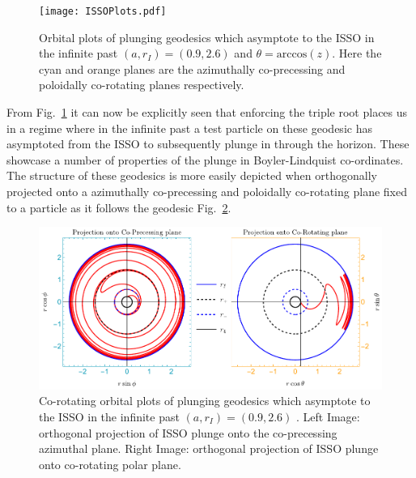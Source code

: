 \documentclass[12pt, amsmath]{revtex4-2}
\begin{document}
\begin{figure}[tb!]
\centering
    \texttt{[image: ISSOPlots.pdf]}
    \caption{Orbital plots of plunging geodesics which asymptote to the ISSO in the infinite past $(a,r_I) = (0.9,2.6)$ and $\theta = \mathrm{arccos}(z)$. Here the cyan and orange planes are the azimuthally co-precessing and poloidally co-rotating planes respectively. } 
    \label{fig:ISSOplots}
\end{figure}
From Fig.~\ref{fig:ISSOplots} it can now be explicitly seen that enforcing the triple root places us in a regime where in the infinite past a test particle on these geodesic has asymptoted from the ISSO to subsequently plunge in through the horizon. These showcase a number of properties of the plunge in Boyler-Lindquist co-ordinates. The structure of these geodesics is more easily depicted when orthogonally projected onto a azimuthally co-precessing and poloidally co-rotating plane fixed to a particle as it follows the geodesic  Fig.~\ref{fig:coorotatingISSOplots}.
\begin{figure}[tb!]
    \centering
    \includegraphics[width=140mm]{corotatingISSOPlots.pdf}
    \caption{Co-rotating orbital plots of plunging geodesics which asymptote to the ISSO in the infinite past $(a,r_I) = (0.9,2.6)$ . Left Image: orthogonal projection of ISSO plunge onto the co-precessing azimuthal plane. Right Image: orthogonal projection of ISSO plunge onto co-rotating polar plane.}
    \label{fig:coorotatingISSOplots}
\end{figure}
\end{document}
